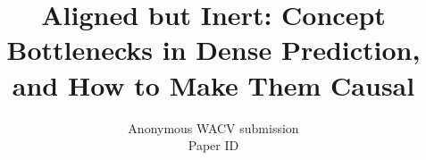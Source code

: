 \documentclass[10pt,twocolumn,letterpaper]{article}
\title{Aligned but Inert: Concept Bottlenecks in Dense Prediction,\\
       and How to Make Them Causal}
\author{Anonymous WACV submission\\
Paper ID \wacvPaperID\\
}
\begin{document}
\maketitle








\clearpage   %
{\small


}
\end{document}
